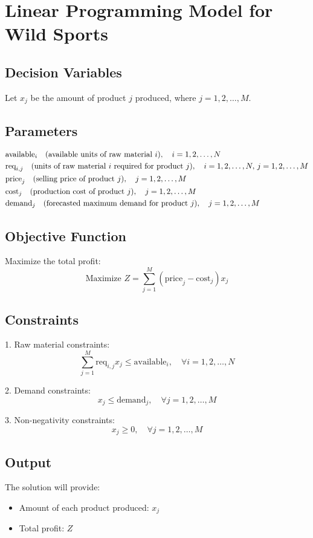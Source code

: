 \documentclass{article}
\begin{document}
\section*{Linear Programming Model for Wild Sports}

\subsection*{Decision Variables}
Let \( x_j \) be the amount of product \( j \) produced, where \( j = 1, 2, \ldots, M \).

\subsection*{Parameters}
\begin{align*}
& \text{available}_i \quad \text{(available units of raw material \( i \))}, \quad i = 1, 2, \ldots, N \\
& \text{req}_{i,j} \quad \text{(units of raw material \( i \) required for product \( j \))}, \quad i = 1, 2, \ldots, N, \, j = 1, 2, \ldots, M \\
& \text{price}_j \quad \text{(selling price of product \( j \))}, \quad j = 1, 2, \ldots, M \\
& \text{cost}_j \quad \text{(production cost of product \( j \))}, \quad j = 1, 2, \ldots, M \\
& \text{demand}_j \quad \text{(forecasted maximum demand for product \( j \))}, \quad j = 1, 2, \ldots, M 
\end{align*}

\subsection*{Objective Function}
Maximize the total profit:
\[
\text{Maximize } Z = \sum_{j=1}^{M} ( \text{price}_j - \text{cost}_j ) x_j
\]

\subsection*{Constraints}
1. Raw material constraints:
\[
\sum_{j=1}^{M} \text{req}_{i,j} x_j \leq \text{available}_i, \quad \forall i = 1, 2, \ldots, N
\]

2. Demand constraints:
\[
x_j \leq \text{demand}_j, \quad \forall j = 1, 2, \ldots, M
\]

3. Non-negativity constraints:
\[
x_j \geq 0, \quad \forall j = 1, 2, \ldots, M
\]

\subsection*{Output}
The solution will provide:
\begin{itemize}
    \item Amount of each product produced: \( x_j \)
    \item Total profit: \( Z \)
\end{itemize}
\end{document}
